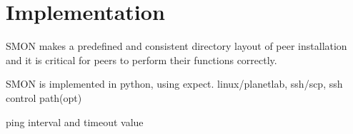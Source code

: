 \section{Implementation}
\label{sec:impl}

SMON makes a predefined and consistent directory layout of
peer installation and it is critical for peers to perform
their functions correctly.

SMON is implemented in python, using expect.
linux/planetlab, ssh/scp, ssh control path(opt)

ping interval and timeout value

